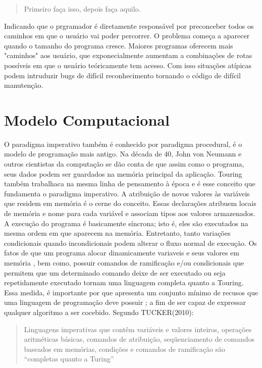 \documentclass[11pt]{article}
\begin{document}
\begin{quote}
Primeiro faça isso, depois faça aquilo.
\end{quote}

Indicando que o prgramador é diretamente responsável por preconceber todos os caminhos em que o usuário vai poder percorrer. O problema começa a aparecer quando o tamanho do programa cresce. Maiores programas oferecem mais "caminhos" aos usuário, que exponecialmente aumentam a combinações de rotas possíveis em que o usuário teóricamente tem acesso. Com isso situações atípicas podem intruduzir bugs de difícil reconhecimento tornando o código de difícil manutenção.

\section{Modelo Computacional}
\label{sec:orga669638}

O paradigma imperativo também é conhecido por paradigma procedural, é o modelo de programação mais antigo. Na década de 40, John von Neumann e outros cientistas da computação se dão conta de que assim como o programa, seus dados podem ser guardados na memória principal da aplicação. Touring também trabalhaca na mesma linha de pensamento à época e é esse conceito que fundamenta o paradigma imperativo. A atribuição de novos valores às variáveis que residem em memória é o cerne do conceito.
Essas declarações atribuem locais de memória e nome para cada variável e associam tipos aos valores armazenados. A execução do programa é basicamente síncrona; isto é, eles são executados na mesma ordem em que aparecem na memória. Entretanto, tanto variações condicionais quando incondicionais podem alterar o fluxo normal de execução. Os fatos de que um programa alocar dinamicamente variaveis e seus valores em memória , bem como, possuir comandos de ramificação e/ou condicionais que permitem que um determinado comando deixe de ser executado ou seja repetidamente executado tornam uma linguagem completa quanto a Touring.
Essa medida, é importante por que apresenta um conjunto mínimo de recusos que uma linguagem de programação deve possuir ; a fim de ser capaz de expressar qualquer algoritmo a ser cocebido. Segundo TUCKER(2010):
\begin{quote}
Linguagens imperativas que contêm variáveis e valores inteiros, operações aritméticas básicas, comandos de atribuição, seqüenciamento de comandos baseados em memórias, condições e comandos de ramificação são “completas quanto a Turing”
\end{quote}
\end{document}
